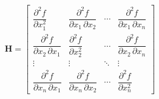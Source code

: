 \documentclass[../convex_optimization.tex]{subfiles}
\begin{document}
\begin{equation}
    \mathbf H = \begin{bmatrix}
        \dfrac{\partial^2 f}{\partial x_1^2} &
        \dfrac{\partial^2 f}{\partial x_1\,\partial x_2} &
        \cdots & \dfrac{\partial^2 f}{\partial x_1\,\partial x_n} \\[2.2ex]
        \dfrac{\partial^2 f}{\partial x_2\,\partial x_1} &
        \dfrac{\partial^2 f}{\partial x_2^2} & \cdots &
        \dfrac{\partial^2 f}{\partial x_2\,\partial x_n} \\[2.2ex]
        \vdots & \vdots & \ddots & \vdots \\[2.2ex]
        \dfrac{\partial^2 f}{\partial x_n\,\partial x_1} &
        \dfrac{\partial^2 f}{\partial x_n\,\partial x_2} &
        \cdots & \dfrac{\partial^2 f}{\partial x_n^2}
    \end{bmatrix}
    \label{hessian_definition}
\end{equation}
\end{document}
